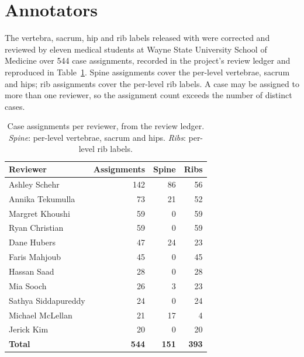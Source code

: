 %
%
\section{Annotators}
\label{app:annotators}

The vertebra, sacrum, hip and rib labels released with \dataset{} were corrected and reviewed by eleven
medical students at Wayne State University School of Medicine over 544 case assignments, recorded in the
project's review ledger and reproduced in Table~\ref{tab:annotators}. Spine assignments cover the per-level
vertebrae, sacrum and hips; rib assignments cover the per-level rib labels. A case may be assigned to more
than one reviewer, so the assignment count exceeds the number of distinct cases.

\begin{table}[h]
\caption{Case assignments per reviewer, from the review ledger. \emph{Spine}: per-level vertebrae, sacrum
and hips. \emph{Ribs}: per-level rib labels.}
\label{tab:annotators}
\centering
\small
\begin{tabular}{lrrr}
\toprule
\bfseries Reviewer & \bfseries Assignments & \bfseries Spine & \bfseries Ribs \\
\midrule
Ashley Schehr        & 142 & 86 & 56 \\
Annika Tekumulla     &  73 & 21 & 52 \\
Margret Khoushi      &  59 &  0 & 59 \\
Ryan Christian       &  59 &  0 & 59 \\
Dane Hubers          &  47 & 24 & 23 \\
Faris Mahjoub        &  45 &  0 & 45 \\
Hassan Saad          &  28 &  0 & 28 \\
Mia Sooch            &  26 &  3 & 23 \\
Sathya Siddapureddy  &  24 &  0 & 24 \\
Michael McLellan     &  21 & 17 &  4 \\
Jerick Kim           &  20 &  0 & 20 \\
\midrule
\bfseries Total      & \bfseries 544 & \bfseries 151 & \bfseries 393 \\
\bottomrule
\end{tabular}
\end{table}


